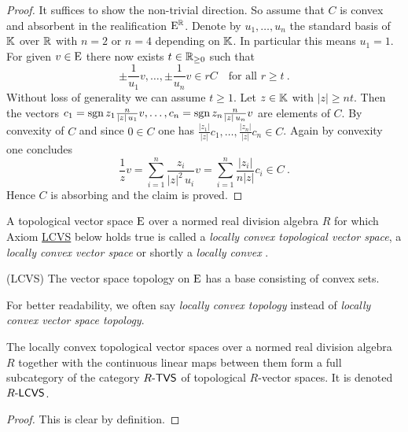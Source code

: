 \begin{proof}
  It suffices to show the non-trivial direction. So assume that $C$ is convex and absorbent in the
  realification $\mathrm{E}^{\mathbb{R}}$. Denote by $u_1,\ldots , u_n$  the standard basis of $\mathbb{K}$
  over $\mathbb{R}$ with $n=2$ or $n=4$ depending on $\mathbb{K}$. In particular this means $u_1 =1$.
  For given $v\in\mathrm{E}$ there now exists $t\in\mathbb{R}_{\geq 0}$ such that
  \[
    \pm \frac{1}{u_1} v , \ldots  , \pm \frac{1}{u_n} v \in rC \quad \text{for all } r\geq t \ .
  \]   
  Without loss of generality we can assume $t\geq 1$. Let $z\in \mathbb{K}$ with $|z| \geq n t$. 
  Then the vectors
  $c_1 = \operatorname{sgn} z_1\frac{n}{|z| \, u_1} v, \ldots , c_n = \operatorname{sgn} z_n\frac{n}{|z| \, u_n} v$
  are elements of $C$. By convexity of $C$ and since $0\in C$ one has
  $ \frac{|z_1|}{|z|} c_1 , \ldots , \frac{|z_n|}{|z|} c_n  \in C$. Again by convexity one concludes
  \[
    \frac{1}{z} v = \sum_{i=1}^n \frac{z_i}{|z|^2 \, u_i} v =
    \sum_{i=1}^n  \frac{|z_i|}{n |z|} c_i \in C \ . 
  \]
  Hence $C$ is absorbing and the claim is proved.   
\end{proof}

\begin{definition}
  A topological vector space $\mathrm{E}$ over a normed real division algebra $R$ for which
  Axiom \hyperref[axiom:tvs-local-convexity]{LCVS} below holds true is called a
  \emph{locally convex topological vector space}, a \emph{locally convex vector space} or shortly a
  \emph{locally convex \tvs}.
  \begin{axiomlist}[\hspace{1.8em}]
  \item[\textup{(}{\sffamily LCVS}\textup{)}\!]
  \label{axiom:tvs-local-convexity} 
    The vector space topology on $\mathrm{E}$ has a base consisting of convex sets. 
  \end{axiomlist}
\end{definition}

\begin{remark}
  For better readability, we often say \emph{locally convex topology} instead of \emph{locally convex vector space topology}.
\end{remark}

\begin{proposition}
  The locally convex topological vector spaces over a normed real division algebra $R$ together with the continuous
  linear maps between them form a full subcategory of the category $R\text{-}\mathsf{TVS}$ of topological
  $R$-vector spaces. It is denoted $R\text{-}\mathsf{LCVS}$.
\end{proposition}
\begin{proof}
  This is clear by definition.
\end{proof}

